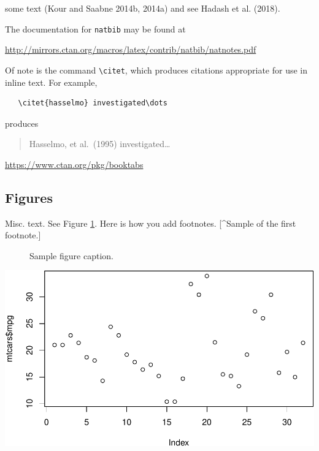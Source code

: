 \documentclass{article}
\newenvironment{Shaded}{\begin{snugshade}}{\end{snugshade}}
\newcommand{\KeywordTok}[1]{\textcolor[rgb]{0.13,0.29,0.53}{\textbf{#1}}}
\newcommand{\NormalTok}[1]{#1}
\newcommand{\OperatorTok}[1]{\textcolor[rgb]{0.81,0.36,0.00}{\textbf{#1}}}
\begin{document}
\label{sec:others}

\lipsum[8] some text (Kour and Saabne 2014b, 2014a) and see Hadash et
al. (2018).

The documentation for \verb+natbib+ may be found at

\begin{center}
  \url{http://mirrors.ctan.org/macros/latex/contrib/natbib/natnotes.pdf}
\end{center}

Of note is the command \verb+\citet+, which produces citations
appropriate for use in inline text. For example,

\begin{verbatim}
   \citet{hasselmo} investigated\dots
\end{verbatim}

produces

\begin{quote}
  Hasselmo, et al.\ (1995) investigated\dots
\end{quote}

\begin{center}
  \url{https://www.ctan.org/pkg/booktabs}
\end{center}

\hypertarget{figures}{%
\subsection{Figures}\label{figures}}

Misc. text. See Figure \ref{fig:fig1}. Here is how you add footnotes.
{[}\^{}Sample of the first footnote.{]}

\begin{figure}
  \centering
  \fbox{\rule[-.5cm]{4cm}{4cm} \rule[-.5cm]{4cm}{0cm}}
  \caption{Sample figure caption.}
  \label{fig:fig1}
\end{figure}

\begin{Shaded}
\end{Shaded}

\includegraphics{Moroney_FinalReport_files/figure-latex/unnamed-chunk-1-1.pdf}
\end{document}
